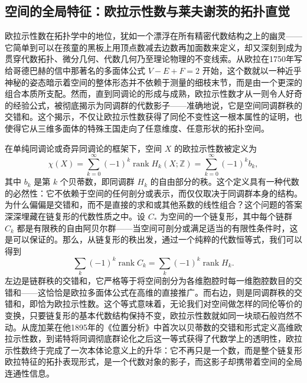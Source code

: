 \documentclass[12pt,a4paper]{article}
\begin{document}
\subsection{空间的全局特征：欧拉示性数与莱夫谢茨的拓扑直觉}


欧拉示性数在拓扑学中的地位，犹如一个漂浮在所有精密代数结构之上的幽灵——它简单到可以在孩童的黑板上用顶点数减去边数再加面数来定义，却又深刻到成为贯穿代数拓扑、微分几何、代数几何乃至理论物理的不变线索。从欧拉在1750年写给哥德巴赫的信中那著名的多面体公式 $V - E + F = 2$ 开始，这个数就以一种近乎神秘的姿态暗示着空间的整体形态并不依赖于测量的细枝末节，而是由一个更深的组合本质所支配。然而，直到同调论的形成与成熟，欧拉示性数才从一则令人好奇的经验公式，被彻底揭示为同调群的代数影子——准确地说，它是空间同调群秩的交错和。这个揭示，不仅让欧拉示性数获得了同伦不变性这一根本属性的证明，也使得它从三维多面体的特殊王国走向了任意维度、任意形状的拓扑空间。

在单纯同调论或奇异同调论的框架下，空间 $X$ 的欧拉示性数被定义为
$$
\chi(X) = \sum_{k=0}^{\infty} (-1)^k \operatorname{rank} H_k(X;\mathbb{Z}) = \sum_{k=0}^{\infty} (-1)^k b_k,
$$
其中 $b_k$ 是第 $k$ 个贝蒂数，即同调群 $H_k$ 的自由部分的秩。这个定义具有一种代数的必然性：它不依赖于空间的任何剖分或表示，而仅仅取决于同调群本身的结构。为什么偏偏是交错和，而不是直接的求和或其他系数的线性组合？这个问题的答案深深埋藏在链复形的代数性质之中。设 $C_*$ 为空间的一个链复形，其中每个链群 $C_k$ 都是有限秩的自由阿贝尔群——当空间可剖分或满足适当的有限性条件时，这是可以保证的。那么，从链复形的秩出发，通过一个纯粹的代数恒等式，我们可以得到
$$
\sum_{k} (-1)^k \operatorname{rank} C_k = \sum_{k} (-1)^k \operatorname{rank} H_k.
$$
左边是链群秩的交错和，它严格等于将空间剖分为各维胞腔时每一维胞腔数目的交错和——这恰恰是欧拉多面体公式在高维的直接推广。而右边，则是同调群秩的交错和，即恰为欧拉示性数。这个等式意味着，无论我们对空间做怎样的同伦等价的变换，只要链复形的基本代数结构保持不变，欧拉示性数就如同一块顽石般岿然不动。从庞加莱在他1895年的《位置分析》中首次以贝蒂数的交错和形式定义高维欧拉示性数，到诺特将同调彻底群论化之后这一等式获得了代数学上的透明性，欧拉示性数终于完成了一次本体论意义上的升华：它不再只是一个数，而是整个链复形欧拉特征的拓扑表现形式，是一个代数对象的影子，而这影子却携带着空间的全局连通性信息。
\end{document}
